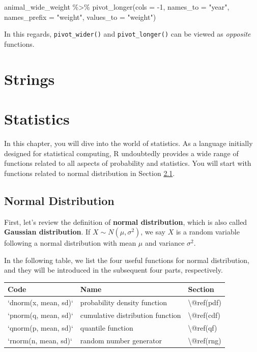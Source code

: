 \documentclass[
]{book}
\newenvironment{Shaded}{\begin{snugshade}}{\end{snugshade}}
\newcommand{\AttributeTok}[1]{\textcolor[rgb]{0.77,0.63,0.00}{#1}}
\newcommand{\DecValTok}[1]{\textcolor[rgb]{0.00,0.00,0.81}{#1}}
\newcommand{\FunctionTok}[1]{\textcolor[rgb]{0.00,0.00,0.00}{#1}}
\newcommand{\NormalTok}[1]{#1}
\newcommand{\SpecialCharTok}[1]{\textcolor[rgb]{0.00,0.00,0.00}{#1}}
\newcommand{\StringTok}[1]{\textcolor[rgb]{0.31,0.60,0.02}{#1}}
\begin{document}
\begin{Shaded}
\begin{Highlighting}[]
\NormalTok{animal\_wide\_weight }\SpecialCharTok{\%\textgreater{}\%} 
  \FunctionTok{pivot\_longer}\NormalTok{(}\AttributeTok{cols =} \SpecialCharTok{{-}}\DecValTok{1}\NormalTok{, }
               \AttributeTok{names\_to =} \StringTok{"year"}\NormalTok{,}
               \AttributeTok{names\_prefix =} \StringTok{"weight"}\NormalTok{, }
               \AttributeTok{values\_to =} \StringTok{"weight"}\NormalTok{)}
\end{Highlighting}
\end{Shaded}

In this regards, \texttt{pivot\_wider()} and \texttt{pivot\_longer()} can be viewed as \emph{opposite} functions.

\hypertarget{strings}{%
\chapter{Strings}\label{strings}}

\hypertarget{statistics}{%
\chapter{Statistics}\label{statistics}}

In this chapter, you will dive into the world of statistics. As a language initially designed for statistical computing, R undoubtedly provides a wide range of functions related to all aspects of probability and statistics. You will start with functions related to normal distribution in Section \ref{normal-distribution}.

\hypertarget{normal-distribution}{%
\section{Normal Distribution}\label{normal-distribution}}

First, let's review the definition of \textbf{normal distribution}, which is also called \textbf{Gaussian distribution}. If \(X\sim N(\mu, \sigma^2)\), we say \(X\) is a random variable following a normal distribution with mean \(\mu\) and variance \(\sigma^2\).

In the following table, we list the four useful functions for normal distribution, and they will be introduced in the subsequent four parts, respectively.

\begin{tabular}{l|l|l}
\hline
Code & Name & Section\\
\hline
`dnorm(x, mean, sd)` & probability density function & \textbackslash{}@ref(pdf)\\
\hline
`pnorm(q, mean, sd)` & cumulative distribution function & \textbackslash{}@ref(cdf)\\
\hline
`qnorm(p, mean, sd)` & quantile function & \textbackslash{}@ref(qf)\\
\hline
`rnorm(n, mean, sd)` & random number generator & \textbackslash{}@ref(rng)\\
\hline
\end{tabular}
\end{document}
